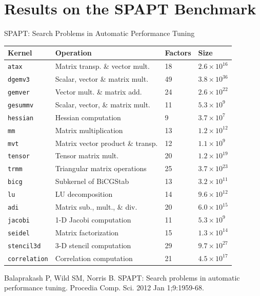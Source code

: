 \documentclass[10pt, compress, aspectratio=169, xcolor={table,usenames,dvipsnames}]{beamer}
\begin{document}
\section{Results on the SPAPT Benchmark}
\label{sec:org89ec686}
\begin{frame}[label={sec:orgdb35555},fragile]{SPAPT: Search Problems in Automatic Performance Tuning}
 \begin{center}
\begin{table}[t]
\label{tab:org19b128e}
\centering
\scriptsize
\begin{tabular}{llll}
\toprule
Kernel & Operation & Factors & Size\\
\midrule
\texttt{atax} & Matrix transp. \& vector mult. & 18 & \(2.6 \times 10^{16}\)\\
\texttt{dgemv3} & Scalar, vector \& matrix mult. & 49 & \(3.8 \times 10^{36}\)\\
\texttt{gemver} & Vector mult. \& matrix add. & 24 & \(2.6 \times 10^{22}\)\\
\texttt{gesummv} & Scalar, vector, \& matrix mult. & 11 & \(5.3 \times 10^{9}\)\\
\texttt{hessian} & Hessian computation & 9 & \(3.7 \times 10^{7}\)\\
\texttt{mm} & Matrix multiplication & 13 & \(1.2 \times 10^{12}\)\\
\texttt{mvt} & Matrix vector product \& transp. & 12 & \(1.1 \times 10^{9}\)\\
\texttt{tensor} & Tensor matrix mult. & 20 & \(1.2 \times 10^{19}\)\\
\texttt{trmm} & Triangular matrix operations & 25 & \(3.7 \times 10^{23}\)\\
\texttt{bicg} & Subkernel of BiCGStab & 13 & \(3.2 \times 10^{11}\)\\
\texttt{lu} & LU decomposition & 14 & \(9.6 \times 10^{12}\)\\
\texttt{adi} & Matrix sub., mult., \& div. & 20 & \(6.0 \times 10^{15}\)\\
\texttt{jacobi} & 1-D Jacobi computation & 11 & \(5.3 \times 10^{9}\)\\
\texttt{seidel} & Matrix factorization & 15 & \(1.3 \times 10^{14}\)\\
\texttt{stencil3d} & 3-D stencil computation & 29 & \(9.7 \times 10^{27}\)\\
\texttt{correlation} & Correlation computation & 21 & \(4.5 \times 10^{17}\)\\
\bottomrule
\end{tabular}
\end{table}

\scriptsize{Balaprakash P, Wild SM, Norris B. SPAPT: Search problems in automatic performance tuning. Procedia Comp. Sci. 2012 Jan 1;9:1959-68.}
\end{center}
\end{frame}
\end{document}
